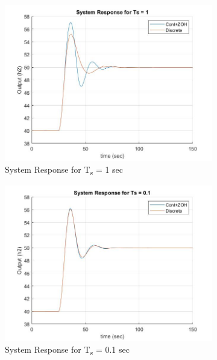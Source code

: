 \documentclass[a4paper,12pt,oneside,onecolumn]{article} %
\begin{document}
\begin{figure}[H]
\begin{subfigure}{0.4\textwidth}
  \includegraphics[width = \textwidth]{ex_8_3}
\caption{System Response for T\textsubscript{s} = 1 sec}
\end{subfigure}
\vspace{1em}
\begin{subfigure}{0.4\textwidth}
  \includegraphics[width = \textwidth]{ex_8_4}
\caption{System Response for T\textsubscript{s} = 0.1 sec}
\end{subfigure}
\vspace{1em}
\begin{subfigure}{0.4\textwidth}

\end{subfigure}
\end{figure}
\end{document}
